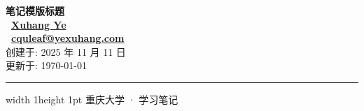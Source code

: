 \thispagestyle{empty} %

\vspace*{3cm}
\begin{center}
    {\Huge\bfseries\color{black} 笔记模版标题} \\ [4em]
    
    {\Large\bfseries\color{cyan}
        \faUser\ \href{https://yexuhang.com/}{Xuhang Ye} \\ [0.5em]
        \faEnvelope\ \href{mailto:cquleaf@yexuhang.com}{cquleaf@yexuhang.com}
    } \\[4em]
    
    {\normalsize\color{red}
        创建于: 2025 年 11 月 11 日 \\ [0.5em]
        更新于: \today
    }
\end{center}

\vfill
\begin{center}
    \hrule width 1\textwidth height 1pt
    \vspace{0.5em}
    \small\color{gray} 重庆大学 · 学习笔记
\end{center}

\newpage

\tableofcontents
\newpage